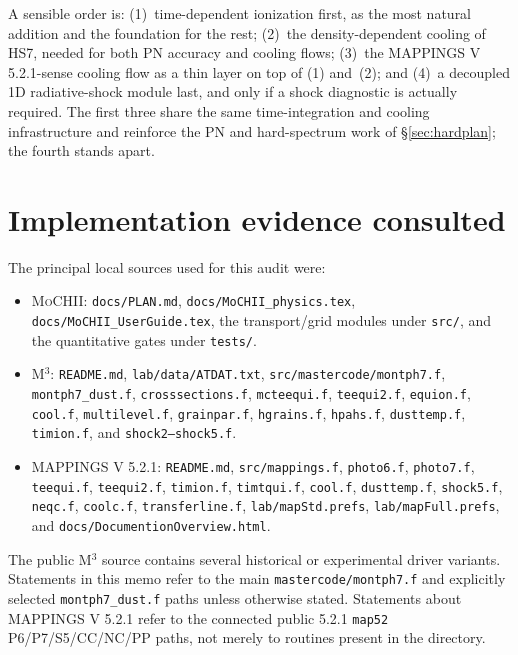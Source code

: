 \documentclass[english,a4paper]{my_memo}
\newcommand{\code}[1]{\texttt{#1}}
\newcommand{\MoCHII}{\textsc{MoCHII}}
\newcommand{\Mthree}{M$^3$}
\newcommand{\Mappings}{MAPPINGS V 5.2.1}
\begin{document}
\noindent A sensible order is: (1)~time-dependent ionization first, as the
most natural addition and the foundation for the rest; (2)~the
density-dependent cooling of HS7, needed for both PN accuracy and cooling
flows; (3)~the \Mappings{}-sense cooling flow as a thin layer on top of
(1) and~(2); and (4)~a decoupled 1D radiative-shock module last, and only
if a shock diagnostic is actually required.  The first three share the
same time-integration and cooling infrastructure and reinforce the PN and
hard-spectrum work of \S\ref{sec:hardplan}; the fourth stands apart.

\section{Implementation evidence consulted}

The principal local sources used for this audit were:

\begin{itemize}[leftmargin=2em]
\item \MoCHII{}: \code{docs/PLAN.md}, \code{docs/MoCHII\_physics.tex},
  \code{docs/MoCHII\_UserGuide.tex}, the transport/grid modules under
  \code{src/}, and the quantitative gates under \code{tests/}.
\item \Mthree{}: \code{README.md}, \code{lab/data/ATDAT.txt},
  \code{src/mastercode/montph7.f}, \code{montph7\_dust.f},
  \code{crosssections.f}, \code{mcteequi.f}, \code{teequi2.f},
  \code{equion.f}, \code{cool.f}, \code{multilevel.f},
  \code{grainpar.f}, \code{hgrains.f}, \code{hpahs.f},
  \code{dusttemp.f}, \code{timion.f}, and \code{shock2--shock5.f}.
\item \Mappings{}: \code{README.md}, \code{src/mappings.f},
  \code{photo6.f}, \code{photo7.f}, \code{teequi.f}, \code{teequi2.f},
  \code{timion.f}, \code{timtqui.f}, \code{cool.f}, \code{dusttemp.f},
  \code{shock5.f}, \code{neqc.f}, \code{coolc.f},
  \code{transferline.f}, \code{lab/mapStd.prefs},
  \code{lab/mapFull.prefs}, and \code{docs/DocumentionOverview.html}.
\end{itemize}

The public \Mthree{} source contains several historical or experimental
driver variants.  Statements in this memo refer to the main
\code{mastercode/montph7.f} and explicitly selected
\code{montph7\_dust.f} paths unless otherwise stated.
Statements about \Mappings{} refer to the connected public 5.2.1
\code{map52} P6/P7/S5/CC/NC/PP paths, not merely to routines present in
the directory.
\end{document}
